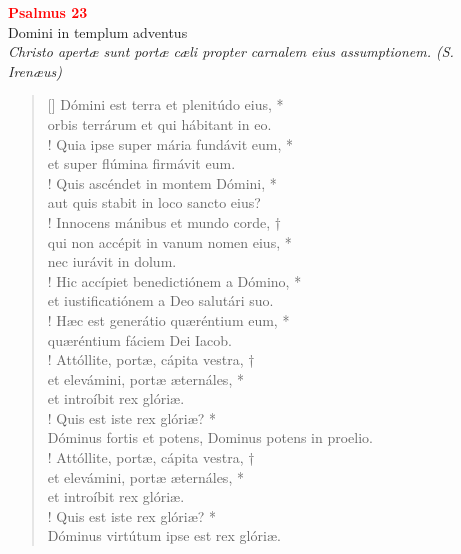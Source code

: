 


\def\greinitialformat#1{%
{\fontsize{39}{39}\selectfont #1}%
}




\vspace{0.3cm}
\begin{center}
 \textcolor{red}{\large \bf Psalmus 23}\\
Domini in templum adventus\\
\textit{\small Christo apertæ sunt portæ cæli propter carnalem eius assumptionem. (S. Irenæus)}
\end{center}
\begin{verse}[\versewidth]
Dómini est terra et plenitúdo eius, *\\
orbis terrárum et qui hábitant in eo.\\!
\vin Quia ipse super mária fundávit eum, *\\
\vin et super flúmina firmávit eum.\\!
Quis ascéndet in montem Dómini, *\\
aut quis stabit in loco sancto eius?\\!
\vin Innocens mánibus et mundo corde, †\\
\vin qui non accépit in vanum nomen eius, *\\
\vin nec iurávit in dolum.\\!
Hic accípiet benedictiónem a Dómino, *\\
et iustificatiónem a Deo salutári suo.\\!
\vin Hæc est generátio quæréntium eum, *\\
\vin quæréntium fáciem Dei Iacob.\\!
Attóllite, portæ, cápita vestra, †\\
et elevámini, portæ æternáles, *\\
et introíbit rex glóriæ.\\!
\vin Quis est iste rex glóriæ? *\\
\vin Dóminus fortis et potens, Dominus potens in proelio.\\!
Attóllite, portæ, cápita vestra, †\\
et elevámini, portæ æternáles, *\\
et introíbit rex glóriæ.\\!
\vin Quis est iste rex glóriæ? *\\
\vin Dóminus virtútum ipse est rex glóriæ.\\
\end{verse}
\vspace{1cm}


